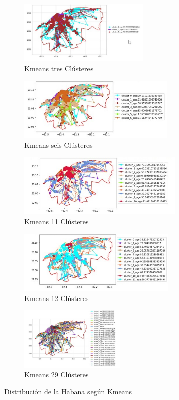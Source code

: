 \begin{figure}[h!]
	\centering
	
	\begin{subfigure}[b]{0.49\linewidth}
		\includegraphics[width=\linewidth, height=3cm]{Images/3.jpg}
		\caption{Kmeans tres Clústeres}
	\end{subfigure}
	\begin{subfigure}[b]{0.49\linewidth}
		\includegraphics[width=\linewidth, height=3cm]{Images/6.jpg}
		\caption{Kmeans seis Clústeres}
	\end{subfigure}
	\begin{subfigure}[b]{0.49\linewidth}
		\includegraphics[width=\linewidth, height=3cm]{Images/11.jpg}
		\caption{Kmeans 11 Clústeres}
	\end{subfigure}
	\begin{subfigure}[b]{0.49\linewidth}
		\includegraphics[width=\linewidth, height=3cm]{Images/12.jpg}
		\caption{Kmeans 12 Clústeres}
	\end{subfigure}
	\begin{subfigure}[b]{0.49\linewidth}
		\includegraphics[width=\linewidth, height=3cm]{Images/29.jpg}
		\caption{Kmeans 29 Clústeres}
	\end{subfigure}
	\caption{Distribución de la Habana según Kmeans}
	\label{fig:Kmeans}
\end{figure}


